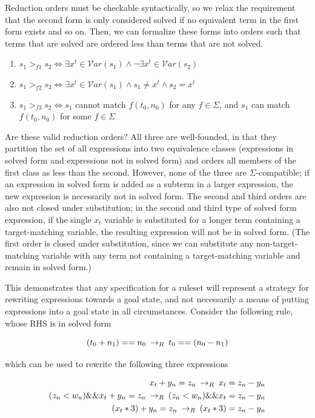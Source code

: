 Reduction orders must be checkable syntactically, so we relax the requirement that the second form is only considered solved if no equivalent term in the first form exists and so on. Then, we can formalize these forms into orders such that terms that are solved are ordered less than terms that are not solved.

\begin{enumerate}
    \item $s_1 >_{f1} s_2 \iff \exists x^t \in \mathcal{V}ar(s_1) \wedge \neg \exists x^t \in \mathcal{V}ar(s_2)$
    \item $s_1 >_{f2} s_2 \iff \exists x^t \in \mathcal{V}ar(s_1) \wedge s_1 \neq x^t \wedge s_2 = x^t$
    \item $s_1 >_{f3} s_2 \iff s_1$ cannot match $f(t_0, n_0)$ for any $f \in \Sigma$, and $s_1$ can match $f(t_0, n_0)$ for some $f \in \Sigma$
\end{enumerate}

Are these valid reduction orders? All three are well-founded, in that they partition the set of all expressions into two equivalence classes (expressions in solved form and expressions not in solved form) and orders all members of the first class as less than the second. However, none of the three are $\Sigma$-compatible; if an expression in solved form is added as a subterm in a larger expression, the new expression is necessarily not in solved form. The second and third orders are also not closed under substitution; in the second and third type of solved form expression, if the single $x_t$ variable is substituted for a longer term containing a target-matching variable, the resulting expression will not be in solved form. (The first order is closed under substitution, since we can substitute any non-target-matching variable with any term not containing a target-matching variable and remain in solved form.)

This demonstrates that any specification for a ruleset will represent a strategy for rewriting expressions towards a goal state, and not necessarily a means of putting expressions into a goal state in all circumstances. Consider the following rule, whose RHS is in solved form

\[ (t_0 + n_1) == n_0 \:\rightarrow_{R}\: t_0 == (n_0 - n_1)
\]

which can be used to rewrite the following three expressions

\begin{align*}
x_t + y_n = z_n \:\rightarrow_{R}\: x_t = z_n - y_n \\
(z_n < w_n) \&\& x_t + y_n = z_n \:\rightarrow_{R}\: (z_n < w_n) \&\& x_t = z_n - y_n \\
(x_t * 3) + y_n = z_n \:\rightarrow_{R}\: (x_t * 3) = z_n - y_n 
\end{align*}

